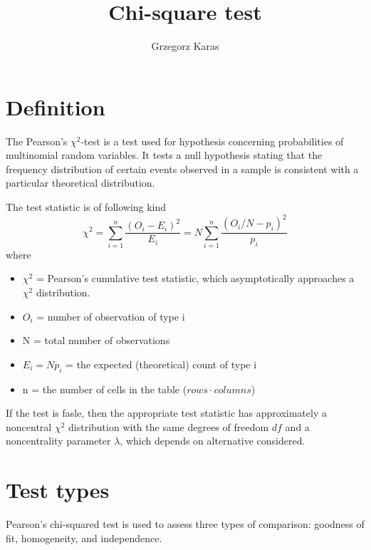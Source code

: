 \documentclass{article}
\title{Chi-square test}
\author{Grzegorz Karas}
\begin{document}
\maketitle


\section{Definition \cite{wiki, paper}}
The Pearson's $\chi^2$-test is a test used for hypothesis concerning 
probabilities of multinomial random variables. It tests a null hypothesis stating that the frequency distribution of certain 
events observed in a sample is consistent with a particular theoretical distribution.

The test statistic is of following kind
\begin{equation}
    \chi^2=\sum_{i=1}^n \frac{\left(O_i-E_i\right)^2}{E_i} = N \sum_{i=1}^n \frac{\left(O_i/N-p_i\right)^2}{p_i}
\end{equation}
where
\begin{itemize}
    \item $\chi^2$ = Pearson's cumulative test statistic, which asymptotically approaches a $\chi^2$ distribution.
    \item $O_i$ = number of observation of type i
    \item N = total number of observations
    \item $E_i = Np_i$ = the expected (theoretical) count of type i
    \item n = the number of cells in the table ($rows\cdot columns$)
\end{itemize}

If the test is fasle, then the appropriate test statistic has approximately 
a noncentral $\chi^2$ distribution with the same degrees of freedom $df$ and
a noncentrality parameter $\lambda$, which depends on alternative considered.

\section{Test types}
Pearson's chi-squared test is used to assess three types of comparison: 
goodness of fit, homogeneity, and independence.
\end{document}
